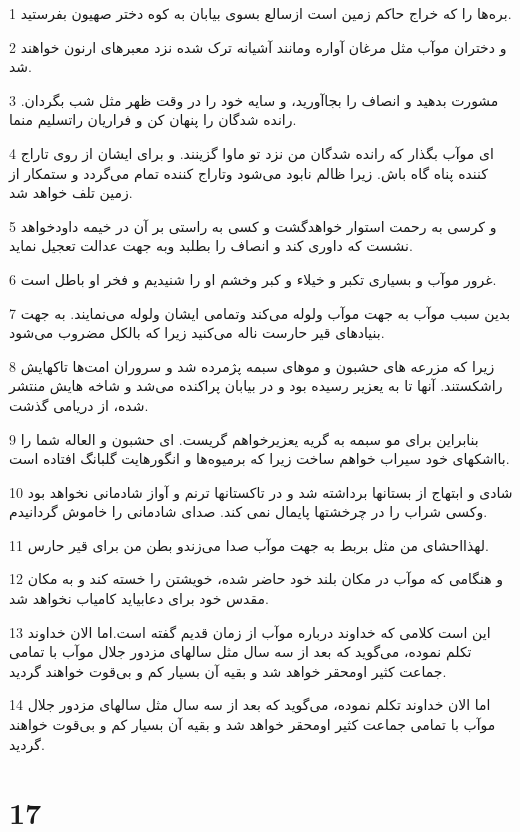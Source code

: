 \par 1 بره‌ها را که خراج حاکم زمین است ازسالع بسوی بیابان به کوه دختر صهیون بفرستید.
\par 2 و دختران موآب مثل مرغان آواره ومانند آشیانه ترک شده نزد معبرهای ارنون خواهند شد.
\par 3 مشورت بدهید و انصاف را بجاآورید، و سایه خود را در وقت ظهر مثل شب بگردان. رانده شدگان را پنهان کن و فراریان راتسلیم منما.
\par 4 ‌ای موآب بگذار که رانده شدگان من نزد تو ماوا گزینند. و برای ایشان از روی تاراج کننده پناه گاه باش. زیرا ظالم نابود می‌شود وتاراج کننده تمام می‌گردد و ستمکار از زمین تلف خواهد شد.
\par 5 و کرسی به رحمت استوار خواهدگشت و کسی به راستی بر آن در خیمه داودخواهد نشست که داوری کند و انصاف را بطلبد وبه جهت عدالت تعجیل نماید.
\par 6 غرور موآب و بسیاری تکبر و خیلاء و کبر وخشم او را شنیدیم و فخر او باطل است.
\par 7 بدین سبب موآب به جهت موآب ولوله می‌کند وتمامی ایشان ولوله می‌نمایند. به جهت بنیادهای قیر حارست ناله می‌کنید زیرا که بالکل مضروب می‌شود.
\par 8 زیرا که مزرعه های حشبون و موهای سبمه پژمرده شد و سروران امت‌ها تاکهایش راشکستند. آنها تا به یعزیر رسیده بود و در بیابان پراکنده می‌شد و شاخه هایش منتشر شده، از دریامی گذشت.
\par 9 بنابراین برای مو سبمه به گریه یعزیرخواهم گریست. ای حشبون و العاله شما را بااشکهای خود سیراب خواهم ساخت زیرا که برمیوه‌ها و انگورهایت گلبانگ افتاده است. 
\par 10 شادی و ابتهاج از بستانها برداشته شد و در تاکستانها ترنم و آواز شادمانی نخواهد بود وکسی شراب را در چرخشتها پایمال نمی کند. صدای شادمانی را خاموش گردانیدم.
\par 11 لهذااحشای من مثل بربط به جهت موآب صدا می‌زندو بطن من برای قیر حارس.
\par 12 و هنگامی که موآب در مکان بلند خود حاضر شده، خویشتن را خسته کند و به مکان مقدس خود برای دعابیاید کامیاب نخواهد شد.
\par 13 این است کلامی که خداوند درباره موآب از زمان قدیم گفته است.اما الان خداوند تکلم نموده، می‌گوید که بعد از سه سال مثل سالهای مزدور جلال موآب با تمامی جماعت کثیر اومحقر خواهد شد و بقیه آن بسیار کم و بی‌قوت خواهند گردید.
\par 14 اما الان خداوند تکلم نموده، می‌گوید که بعد از سه سال مثل سالهای مزدور جلال موآب با تمامی جماعت کثیر اومحقر خواهد شد و بقیه آن بسیار کم و بی‌قوت خواهند گردید.
 
\chapter{17}

